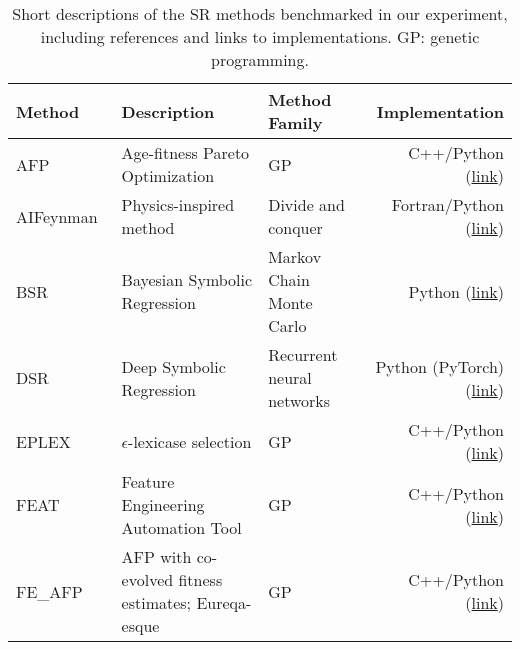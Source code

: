 \begin{table}
    \footnotesize
    \center
    \caption{
        Short descriptions of the SR methods benchmarked in our experiment, including references and links to implementations. 
        GP: genetic programming.
    }\label{tbl:methods}
    \begin{tabular}{l L{12em} L{8em} r}
        Method      &   Description                                         &   Method Family                       &   Implementation  \\ 
        \midrule
        AFP~\cite{schmidtAgefitnessParetoOptimization2011}               &   Age-fitness Pareto Optimization     &   GP
                    &   C++/Python (\href{https://github.com/EpistasisLab/ellyn}{link})                  \\
        AIFeynman~\cite{udrescuAIFeynmanParetooptimal2020}               &   Physics-inspired method             &   Divide and conquer
                    &   Fortran/Python (\href{https://github.com/SJ001/AI-Feynman}{link})              \\
        BSR~\cite{jinBayesianSymbolicRegression2020}                     &   Bayesian Symbolic Regression        &   Markov Chain Monte Carlo
                    &   Python (\href{https://github.com/ying531/MCMC-SymReg}{link})                      \\
        DSR~\cite{petersenDeepSymbolicRegression2020}                    &   Deep Symbolic Regression            &   Recurrent neural networks   
                    &   Python (PyTorch) (\href{https://github.com/brendenpetersen/deep-symbolic-regression}{link})            \\
        EPLEX~\cite{lacavaProbabilisticMultiobjectiveAnalysis2019}       &   $\epsilon$-lexicase selection       &   GP
                    &   C++/Python (\href{https://github.com/EpistasisLab/ellyn}{link})                  \\
        FEAT~\cite{lacavaLearningConciseRepresentations2019c}        &   Feature Engineering Automation Tool &   GP                          
                    &   C++/Python (\href{https://github.com/lacava/feat}{link})                  \\
        FE\_AFP~\cite{schmidtDistillingFreeformNatural2009b}               &   AFP with co-evolved fitness estimates; Eureqa-esque     &   GP
                    &   C++/Python (\href{https://github.com/EpistasisLab/ellyn}{link})                  \\

\end{tabular}
\end{table}
